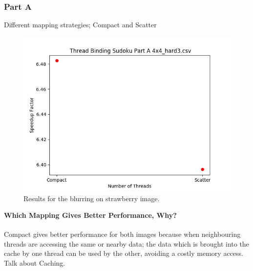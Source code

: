 \documentclass{article}
\newcommand\tab[1][0.5cm]{\hspace*{#1}}
\begin{document}
\subsubsection{Part A}
\begin{description}
    \item[Different mapping strategies; Compact and Scatter]
\end{description}
\begin{figure}[!htb]
    \centering
    \includegraphics[width=1\linewidth]{./img/binding_part_2_A.png}
    \caption{Results for the blurring on strawberry image.}
\end{figure}
\textbf{Which Mapping Gives Better Performance, Why?}\\
\\ \tab Compact gives better performance for both images because 
when neighbouring threads are accessing the same or nearby data;
the data which is brought into the cache by one thread can be used 
by the other, avoiding a costly memory access.
\\ Talk about Caching.


\newpage
\end{document}

